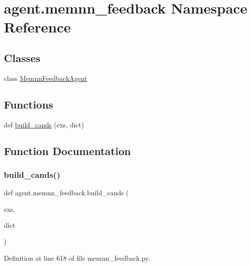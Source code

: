 \hypertarget{namespaceagent_1_1memnn__feedback}{}\section{agent.\+memnn\+\_\+feedback Namespace Reference}
\label{namespaceagent_1_1memnn__feedback}
\subsection*{Classes}
\begin{DoxyCompactItemize}
\item 
class \hyperlink{classagent_1_1memnn__feedback_1_1MemnnFeedbackAgent}{Memnn\+Feedback\+Agent}
\end{DoxyCompactItemize}
\subsection*{Functions}
\begin{DoxyCompactItemize}
\item 
def \hyperlink{namespaceagent_1_1memnn__feedback_ad77d624a2c6f907dc5d44a5c6bd1102a}{build\+\_\+cands} (exs, dict)
\end{DoxyCompactItemize}


\subsection{Function Documentation}
\mbox{\label{namespaceagent_1_1memnn__feedback_ad77d624a2c6f907dc5d44a5c6bd1102a}} 
\subsubsection{\texorpdfstring{build\+\_\+cands()}{build\_cands()}}
{\footnotesize\ttfamily def agent.\+memnn\+\_\+feedback.\+build\+\_\+cands (\begin{DoxyParamCaption}\item[{}]{exs,  }\item[{}]{dict }\end{DoxyParamCaption})}



Definition at line 618 of file memnn\+\_\+feedback.\+py.

